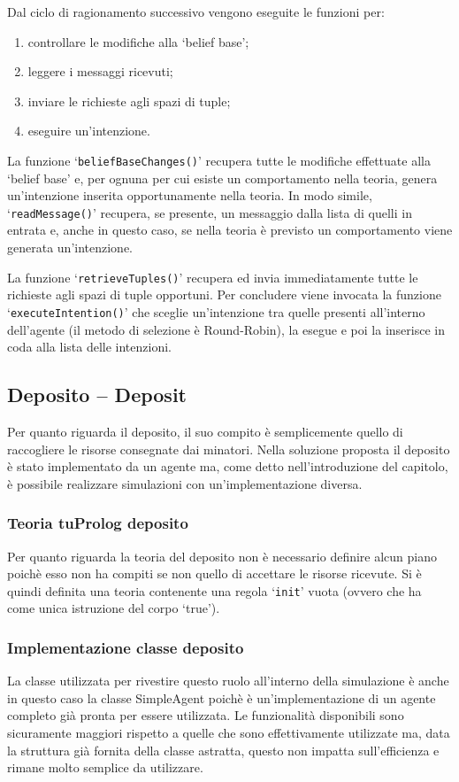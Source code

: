 Dal ciclo di ragionamento successivo vengono eseguite le funzioni per:
\begin{enumerate}
\item controllare le modifiche alla `belief base';
\item leggere i messaggi ricevuti;
\item inviare le richieste agli spazi di tuple;
\item eseguire un'intenzione.
\end{enumerate}
La funzione `\texttt{beliefBaseChanges()}' recupera tutte le modifiche effettuate alla `belief base' e, per ognuna per cui esiste un comportamento nella teoria, genera un'intenzione inserita opportunamente nella teoria. In modo simile, `\texttt{readMessage()}' recupera, se presente, un messaggio dalla lista di quelli in entrata e, anche in questo caso, se nella teoria è previsto un comportamento viene generata un'intenzione.

La funzione `\texttt{retrieveTuples()}' recupera ed invia immediatamente tutte le richieste agli spazi di tuple opportuni.
Per concludere viene invocata la funzione `\texttt{executeIntention()}' che sceglie un'intenzione tra quelle presenti all'interno dell'agente (il metodo di selezione è Round-Robin), la esegue e poi la inserisce in coda alla lista delle intenzioni.

\subsection{Deposito -- Deposit}
Per quanto riguarda il deposito, il suo compito è semplicemente quello di raccogliere le risorse consegnate dai minatori.
Nella soluzione proposta il deposito è stato implementato da un agente ma, come detto nell'introduzione del capitolo, è possibile realizzare simulazioni con un'implementazione diversa.

\subsubsection{Teoria tuProlog deposito}
Per quanto riguarda la teoria del deposito non è necessario definire alcun piano poichè esso non ha compiti se non quello di accettare le risorse ricevute. Si è quindi definita una teoria contenente una regola `\texttt{init}' vuota (ovvero che ha come unica istruzione del corpo `true').

\subsubsection{Implementazione classe deposito}
La classe utilizzata per rivestire questo ruolo all'interno della simulazione è anche in questo caso la classe SimpleAgent poichè è un'implementazione di un agente completo già pronta per essere utilizzata.
%
Le funzionalità disponibili sono sicuramente maggiori rispetto a quelle che sono effettivamente utilizzate ma, data la struttura già fornita della classe astratta, questo non impatta sull'efficienza e rimane molto semplice da utilizzare.

